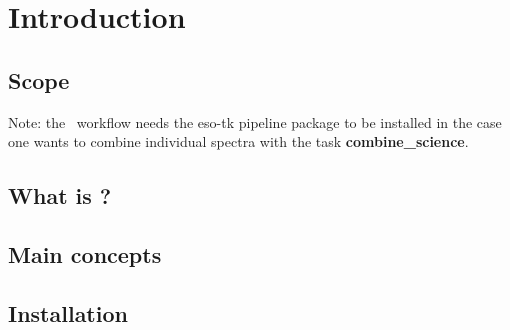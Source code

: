 \section{Introduction}

\subsection{Scope}


Note: the \instname\ workflow needs the eso-tk pipeline package to be installed in the case one wants to combine individual spectra with the task {\bf combine\_science}.

\subsection{What is \edps?}
\label{sec:what_is_edps}


\subsection{Main concepts}
\label{sec:main_concepts}


\subsection{Installation}
\label{sec:installation}

